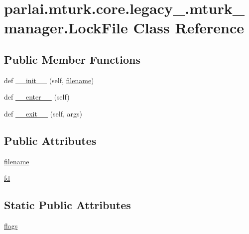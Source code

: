\hypertarget{classparlai_1_1mturk_1_1core_1_1legacy__2018_1_1mturk__manager_1_1LockFile}{}\section{parlai.\+mturk.\+core.\+legacy\+\_.\+mturk\+\_\+manager.\+Lock\+File Class Reference}
\label{classparlai_1_1mturk_1_1core_1_1legacy__2018_1_1mturk__manager_1_1LockFile}
\subsection*{Public Member Functions}
\begin{DoxyCompactItemize}
\item 
def \hyperlink{classparlai_1_1mturk_1_1core_1_1legacy__2018_1_1mturk__manager_1_1LockFile_a60d56a27c815eb4c5d198453799c97bf}{\+\_\+\+\_\+init\+\_\+\+\_\+} (self, \hyperlink{classparlai_1_1mturk_1_1core_1_1legacy__2018_1_1mturk__manager_1_1LockFile_a9af987b734760ae5c31822e9bd9d104d}{filename})
\item 
def \hyperlink{classparlai_1_1mturk_1_1core_1_1legacy__2018_1_1mturk__manager_1_1LockFile_abc6edcf2ccbf55e646338d8f0d8c65a2}{\+\_\+\+\_\+enter\+\_\+\+\_\+} (self)
\item 
def \hyperlink{classparlai_1_1mturk_1_1core_1_1legacy__2018_1_1mturk__manager_1_1LockFile_a7d12653d7c19e3d4de616efefdff131d}{\+\_\+\+\_\+exit\+\_\+\+\_\+} (self, args)
\end{DoxyCompactItemize}
\subsection*{Public Attributes}
\begin{DoxyCompactItemize}
\item 
\hyperlink{classparlai_1_1mturk_1_1core_1_1legacy__2018_1_1mturk__manager_1_1LockFile_a9af987b734760ae5c31822e9bd9d104d}{filename}
\item 
\hyperlink{classparlai_1_1mturk_1_1core_1_1legacy__2018_1_1mturk__manager_1_1LockFile_abf58f881aef09dde71fd29aa2b2dfc06}{fd}
\end{DoxyCompactItemize}
\subsection*{Static Public Attributes}
\begin{DoxyCompactItemize}
\item 
\hyperlink{classparlai_1_1mturk_1_1core_1_1legacy__2018_1_1mturk__manager_1_1LockFile_acb708dbda28b3ef729944cb0cbc1ef9d}{flags}
\end{DoxyCompactItemize}


